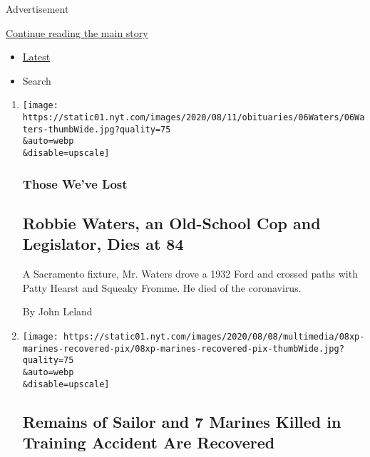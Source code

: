 Advertisement

\protect\hyperlink{after-mid1}{Continue reading the main story}

\begin{itemize}
\tightlist
\item
  \protect\hyperlink{stream-panel}{Latest}
\item
  Search
\end{itemize}

\begin{enumerate}
\def\labelenumi{\arabic{enumi}.}
\item
  \href{/2020/08/08/obituaries/robbie-waters-dead-coronavirus.html}{}

  \texttt{[image: https://static01.nyt.com/images/2020/08/11/obituaries/06Waters/06Waters-thumbWide.jpg?quality=75\\\&auto=webp\\\&disable=upscale]}

  \hypertarget{those-weve-lost}{%
  \subsubsection{Those We've Lost}\label{those-weve-lost}}

  \hypertarget{robbie-waters-an-old-school-cop-and-legislator-dies-at-84}{%
  \subsection{Robbie Waters, an Old-School Cop and Legislator, Dies at
  84}\label{robbie-waters-an-old-school-cop-and-legislator-dies-at-84}}

  A Sacramento fixture, Mr. Waters drove a 1932 Ford and crossed paths
  with Patty Hearst and Squeaky Fromme. He died of the coronavirus.

  By John Leland
\item
  \href{/2020/08/08/us/marines-training-accident-recovered.html}{}

  \texttt{[image: https://static01.nyt.com/images/2020/08/08/multimedia/08xp-marines-recovered-pix/08xp-marines-recovered-pix-thumbWide.jpg?quality=75\\\&auto=webp\\\&disable=upscale]}

  \hypertarget{remains-of-sailor-and-7-marines-killed-in-training-accident-are-recovered}{%
  \subsection{Remains of Sailor and 7 Marines Killed in Training
  Accident Are
  Recovered}\label{remains-of-sailor-and-7-marines-killed-in-training-accident-are-recovered}}


\end{enumerate}
